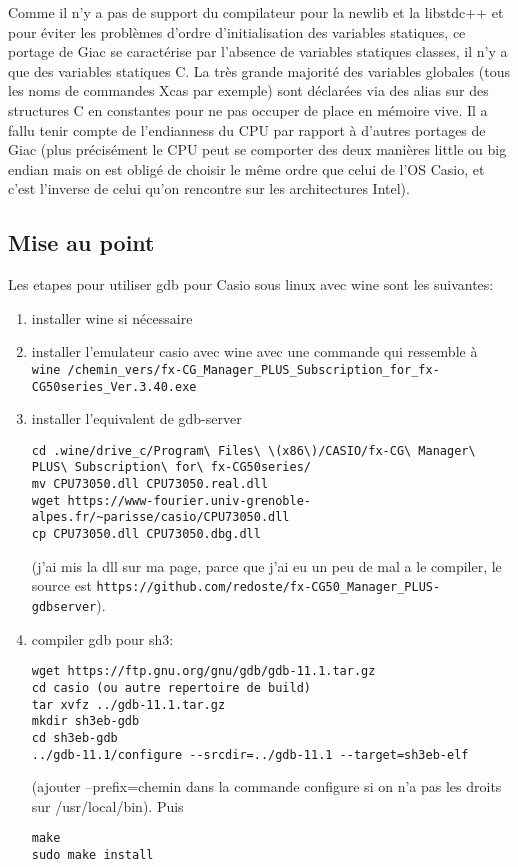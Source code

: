\documentclass{article}
\begin{document}
\begin{giacjshere}
Comme il n'y
a pas de support du compilateur pour la newlib et la libstdc++ et pour
\'eviter les probl\`emes d'ordre d'initialisation des variables statiques,
ce portage de Giac se caract\'erise par l'absence de variables statiques
classes, il n'y a que des variables statiques C. La tr\`es grande
majorit\'e des variables
globales (tous les noms de commandes Xcas par exemple) sont d\'eclar\'ees via
des alias sur des structures C en constantes pour ne
pas occuper de place en m\'emoire vive. Il a fallu tenir compte
de l'endianness du CPU par rapport \`a d'autres portages de Giac
(plus pr\'ecis\'ement le CPU peut se comporter des deux mani\`eres
little ou big endian mais on est oblig\'e de choisir le m\^eme
ordre que celui de l'OS Casio, et c'est l'inverse de celui qu'on
rencontre sur les architectures Intel).

\subsection{Mise au point}
Les etapes pour utiliser gdb pour Casio sous linux avec wine sont les suivantes:
\begin{enumerate}
\item installer wine si n\'ecessaire 
\item installer l'emulateur casio avec wine avec une commande qui
ressemble \`a\\
\verb|wine /chemin_vers/fx-CG_Manager_PLUS_Subscription_for_fx-CG50series_Ver.3.40.exe|
\item
installer l'equivalent de gdb-server
\begin{verbatim}
cd .wine/drive_c/Program\ Files\ \(x86\)/CASIO/fx-CG\ Manager\ PLUS\ Subscription\ for\ fx-CG50series/
mv CPU73050.dll CPU73050.real.dll
wget https://www-fourier.univ-grenoble-alpes.fr/~parisse/casio/CPU73050.dll
cp CPU73050.dll CPU73050.dbg.dll
\end{verbatim}
(j'ai mis la dll sur ma page, parce que j'ai eu un peu de mal a le
compiler, le source est 
\verb|https://github.com/redoste/fx-CG50_Manager_PLUS-gdbserver|).

\item compiler gdb pour sh3:
\begin{verbatim}
wget https://ftp.gnu.org/gnu/gdb/gdb-11.1.tar.gz
cd casio (ou autre repertoire de build)
tar xvfz ../gdb-11.1.tar.gz
mkdir sh3eb-gdb
cd sh3eb-gdb
../gdb-11.1/configure --srcdir=../gdb-11.1 --target=sh3eb-elf
\end{verbatim}
(ajouter --prefix=chemin dans la commande configure si on n'a pas les
droits sur /usr/local/bin).
Puis
\begin{verbatim}
make
sudo make install
\end{verbatim}


\end{enumerate}
\end{giacjshere}
\end{document}
